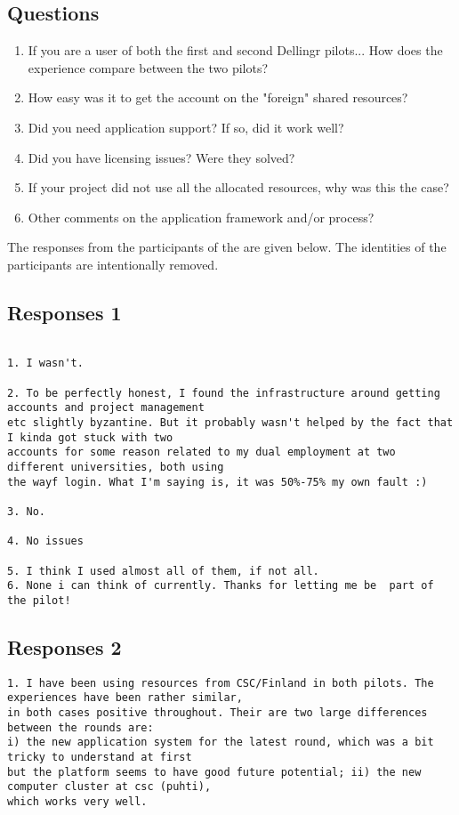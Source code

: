 {
\subsection*{Questions}
\begin{enumerate}
\item If you are a user of both the first and second Dellingr pilots... How does the experience compare between the two pilots?

\item How easy was it to get the account on the "foreign" shared resources?

\item Did you need application support? If so, did it work well?

\item Did you have licensing issues? Were they solved?

\item If your project did not use all the allocated resources, why was this
the case?

\item Other comments on the application framework and/or process?
\end{enumerate}

The responses from the participants of the \pilot are given below.
The identities of the participants are intentionally removed.

\subsection*{ Responses 1}
\begin{verbatim}

1. I wasn't. 

2. To be perfectly honest, I found the infrastructure around getting accounts and project management 
etc slightly byzantine. But it probably wasn't helped by the fact that I kinda got stuck with two 
accounts for some reason related to my dual employment at two different universities, both using 
the wayf login. What I'm saying is, it was 50%-75% my own fault :) 

3. No.

4. No issues

5. I think I used almost all of them, if not all. 
6. None i can think of currently. Thanks for letting me be  part of the pilot!
\end{verbatim}
\subsection*{ Responses 2}
\begin{verbatim}
1. I have been using resources from CSC/Finland in both pilots. The experiences have been rather similar, 
in both cases positive throughout. Their are two large differences between the rounds are: 
i) the new application system for the latest round, which was a bit tricky to understand at first 
but the platform seems to have good future potential; ii) the new computer cluster at csc (puhti), 
which works very well.


\end{verbatim}}
